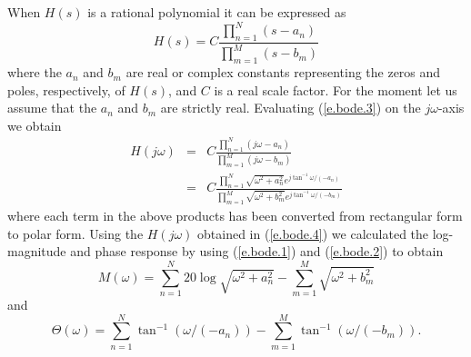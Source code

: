 	When $H(s)$ is a rational polynomial
it can be expressed as
%
\begin{equation}
H(s)=C\frac{\prod_{n=1}^{N}(s-a_n)}{\prod_{m=1}^{M}(s-b_m)}
\label{e.bode.3}
\end{equation}
%
where the $a_n$ and $b_m$ are real or complex constants
representing the zeros and poles, respectively, of $H(s)$,
and $C$ is a real scale factor.
For the moment let us assume that the $a_n$ and $b_m$ are
strictly real.  Evaluating (\ref{e.bode.3}) on the $j\omega$-axis
we obtain
%
\begin{eqnarray}
H(j\omega)&=&C\frac{\prod_{n=1}^{N}(j\omega-a_n)}{\prod_{m=1}^{M}(j\omega-b_m)}\nonumber\\
&=&C\frac{\prod_{n=1}^{N}\sqrt{\omega^2+a_n^2}e^{j\tan^{-1}\omega/(-a_n)}}{\prod_{m=1}^{M}\sqrt{\omega^2+b_m^2}e^{j\tan^{-1}\omega/(-b_m)}}
\label{e.bode.4}
\end{eqnarray}
%
where each term in the above products has been converted
from rectangular form to polar form.  Using the $H(j\omega)$ obtained
in (\ref{e.bode.4}) we
calculated the log-magnitude and phase response by using (\ref{e.bode.1})
and (\ref{e.bode.2}) to obtain
%
\begin{equation}
M(\omega)=\sum_{n=1}^{N}20\log\sqrt{\omega^2+a_n^2}-\sum_{m=1}^M\sqrt{\omega^2+b_m^2}
\label{e.bode.5}
\end{equation}
%
and
%
\begin{equation}
\Theta(\omega)=\sum_{n=1}^{N}\tan^{-1}(\omega/(-a_n))-\sum_{m=1}^M\tan^{-1}(\omega/(-b_m)).
\label{e.bode.6}
\end{equation}
%

